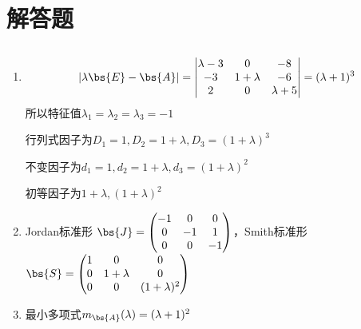 \section{解答题}
\subsection{}
\begin{enumerate}
\item \begin{align*}
|\lambda \bs{E}-\bs{A}|=\begin{vmatrix}
    \lambda-3 &0 &-8 \\
    -3 & 1+\lambda & -6 \\
    2 &0 &\lambda +5
\end{vmatrix}=(\lambda+1)^3
\end{align*}
所以特征值$\lambda_1=\lambda_2=\lambda_3=-1$

行列式因子为$D_1=1,D_2=1+\lambda,D_3=(1+\lambda)^3$

不变因子为$d_1=1,d_2=1+\lambda,d_3=(1+\lambda)^2$

初等因子为$1+\lambda,(1+\lambda)^2$

\item Jordan标准形
$\bs{J}=\begin{pmatrix}
    -1 & 0 & 0\\
    0& -1 & 1 \\
    0& 0 & -1
\end{pmatrix}$，Smith标准形$\bs{S}=\begin{pmatrix}
    1 & 0 & 0\\
    0& 1+\lambda & 0 \\
    0& 0 & (1+\lambda)^2
\end{pmatrix}$

\item 最小多项式$m_{\bs{A}}(\lambda)=(\lambda+1)^2$
\end{enumerate}


